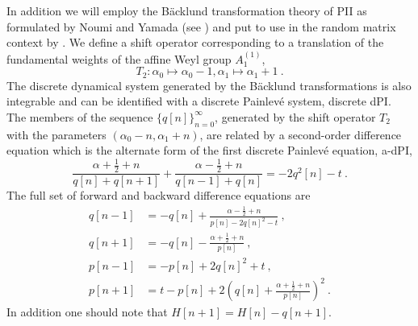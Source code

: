 \documentclass[10pt,reqno]{amsart}
\theoremstyle{plain}
\theoremstyle{definition}
\theoremstyle{remark}
\begin{document}
In addition we will employ the B{\"a}cklund transformation theory of PII as formulated by 
Noumi and Yamada (see \cite{Noumi_2004}) and put to use in the random matrix context by \cite{FW_2001a}.
We define a shift operator corresponding to a translation of the fundamental
weights of the affine Weyl group $ A^{(1)}_1 $,
\begin{equation}
   T_2: \alpha_0 \mapsto \alpha_0-1, \alpha_1 \mapsto \alpha_1+1 \ .
\label{shift-A1}
\end{equation}
The discrete dynamical system generated by the B\"acklund transformations is also integrable and can 
be identified with a discrete Painlev\'e system, discrete dPI. The members of the sequence $ \{q[n]\}_{n=0}^{\infty} $,
generated by the shift operator $ T_2 $ with the parameters $ (\alpha_0-n,\alpha_1+n) $,
are related by a second-order difference equation which is the alternate form of the first discrete 
Painlev\'e equation, a-dPI,
\begin{equation}
   \frac{\alpha + {\tfrac{1}{2}} + n}{q[n]+q[n+1]} +
   \frac{\alpha - {\tfrac{1}{2}} + n}{q[n-1]+q[n]} =
   -2q^2[n] - t \ .
\label{adPI-PII}
\end{equation}
The full set of forward and backward difference equations are \cite{Okamoto_1986}
\begin{align}
   q[n-1] & = -q[n] + \frac{\alpha-{\tfrac{1}{2}}+n}{p[n]-2q[n]^2-t}
   \ ,\label{PII-Bxfm:a} \\
   q[n+1] & = -q[n] - \frac{\alpha+{\tfrac{1}{2}}+n}{p[n]}
   \ ,\label{PII-Bxfm:b} \\
   p[n-1] & = -p[n]+2q[n]^2+t
   \ ,\label{PII-Bxfm:c} \\
   p[n+1] & = t - p[n] + 2\left( q[n] + \frac{\alpha+{\tfrac{1}{2}}+n}{p[n]} \right)^2
   \ .\label{PII-Bxfm:d}
\end{align}
In addition one should note that $ H[n+1]=H[n]-q[n+1] $.
\end{document}
